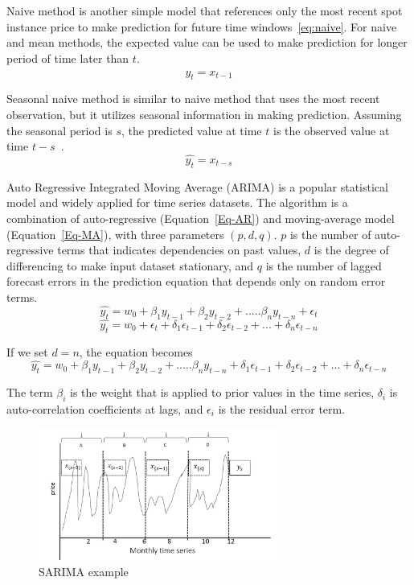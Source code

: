 \documentclass[graybox]{svmult}
\begin{document}
Naive method is another simple model that references only the most recent spot instance price to make prediction for future time windows~\ref{eq:naive}. For naive and mean methods, the expected value can be used to make prediction for longer period of time later than $t$. 
\begin{equation}
  \hat{y_{t}} = x_{t-1} 
\label{eq:naive}
\end{equation}

Seasonal naive method is similar to naive method that uses the most recent observation, but it utilizes seasonal information in making prediction. Assuming the seasonal period is $s$, the predicted value at time $t$ is the observed value at time $t-s$~\cite{time-series-analysis}.
\begin{equation}
  \hat{y_{t}} = x_{t-s} 
\label{smean}
\end{equation}

Auto Regressive Integrated Moving Average (ARIMA) is a popular statistical model and widely applied for time series datasets. The algorithm is a combination of auto-regressive (Equation~\ref{Eq-AR}) and moving-average model (Equation~\ref{Eq-MA}), with three parameters  \((p,d,q)\). \(p\) is the number of auto-regressive terms that indicates dependencies on past values, \(d\) is the degree of differencing to make input dataset stationary, and \(q\) is the number of lagged forecast errors in the prediction equation that depends only on random error terms.
\begin{equation}
\hat{y_t} = w_0 +\beta_1 y_{t-1}+ \beta_2 y_{t-2}+.....\beta_n y_{t-n}+\epsilon_t
\label{Eq-AR}
\end{equation}
\begin{equation}
\hat{y_t} = w_0 +\epsilon_t + \delta_1 \epsilon_{t-1}+  \delta_2 \epsilon_{t-2}+...+ \delta_n \epsilon_{t-n}
\label{Eq-MA}
\end{equation}

If we set \(d = n\), the equation becomes 
\begin{equation}
\hat{y_t} = w_0 +\beta_1 y_{t-1}+ \beta_2 y_{t-2}+.....\beta_n y_{t-n} +  \delta_1 \epsilon_{t-1}+  \delta_2 \epsilon_{t-2}+...+ \delta_n \epsilon_{t-n}
\label{Eq-ARIMA}
\end{equation}

The term \(\beta_i \) is the weight that is applied to prior values in the time series, \(\delta_i \) is auto-correlation coefficients at lags, and \(\epsilon_i \) is the residual error term.

\begin{figure}
\centering\includegraphics[width=0.7\textwidth]{figures/SARIMA.png}\caption{SARIMA example}\label{fig:sarima}
\end{figure}
\end{document}
